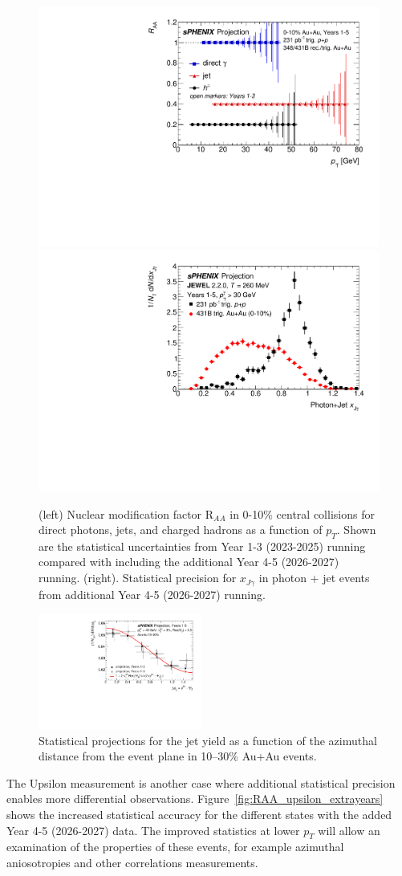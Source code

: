 \begin{figure}
    \centering
    \includegraphics[width=0.48\linewidth]{figs/RAA_jet_2}
    \includegraphics[width=0.48\linewidth]{figs/xJg_2}
    \caption{(left) Nuclear modification factor R$_{AA}$ in 0-10\% central \auau collisions for direct photons, jets, and charged hadrons as a function of $p_T$.   Shown are the statistical uncertainties from Year 1-3 (2023-2025) running compared with including the additional Year 4-5 (2026-2027) running.   (right). Statistical precision for $x_{J\gamma}$ in photon + jet events from additional Year 4-5 (2026-2027) running.}
    \label{fig:RAA_jet_extrayears}
\end{figure}

\begin{figure}[h]
\centering
\includegraphics[width=0.48\textwidth]{figs/jet_dphi_2}
\caption{Statistical projections for the jet yield as a function of the azimuthal distance from the event plane in 10--30\% Au+Au events.}
\label{fig:jet_dphi_proj}
\end{figure}

The Upsilon measurement is another case where additional statistical precision enables more differential observations.   Figure~\ref{fig:RAA_upsilon_extrayears} shows the increased statistical accuracy for the different states with the added Year 4-5 (2026-2027) data.     The improved statistics at lower $p_T$ will allow an examination of the properties of these events, for example azimuthal aniosotropies and other correlations measurements.

